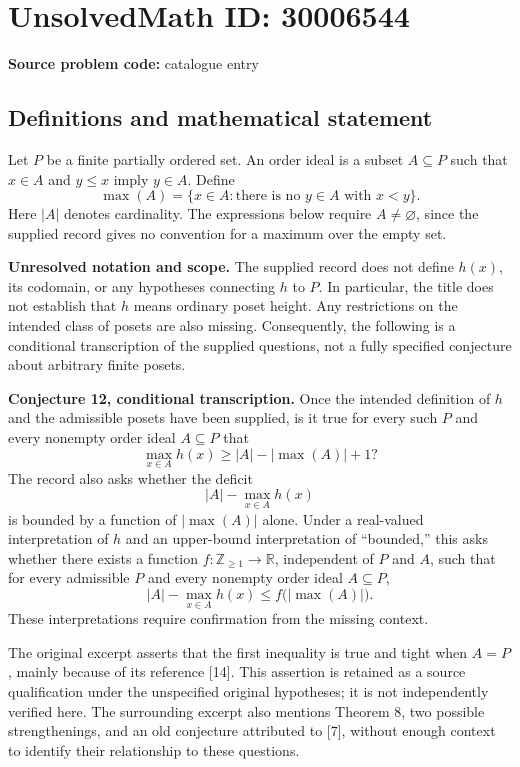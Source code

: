 \documentclass[11pt]{article}
\begin{document}
\section*{UnsolvedMath ID: 30006544}
\textbf{Source problem code:} catalogue entry
\subsection{Definitions and mathematical statement}
Let \(P\) be a finite partially ordered set. An order ideal is a subset \(A\subseteq P\) such that \(x\in A\) and \(y\leq x\) imply \(y\in A\). Define
\[
\max(A)=\{x\in A:\text{there is no }y\in A\text{ with }x<y\}.
\]
Here \(|A|\) denotes cardinality. The expressions below require \(A\neq\varnothing\), since the supplied record gives no convention for a maximum over the empty set.

\textbf{Unresolved notation and scope.} The supplied record does not define \(h(x)\), its codomain, or any hypotheses connecting \(h\) to \(P\). In particular, the title does not establish that \(h\) means ordinary poset height. Any restrictions on the intended class of posets are also missing. Consequently, the following is a conditional transcription of the supplied questions, not a fully specified conjecture about arbitrary finite posets.

\textbf{Conjecture 12, conditional transcription.} Once the intended definition of \(h\) and the admissible posets have been supplied, is it true for every such \(P\) and every nonempty order ideal \(A\subseteq P\) that
\[
\max_{x\in A}h(x)\geq |A|-|\max(A)|+1?
\]
The record also asks whether the deficit
\[
|A|-\max_{x\in A}h(x)
\]
is bounded by a function of \(|\max(A)|\) alone. Under a real-valued interpretation of \(h\) and an upper-bound interpretation of ``bounded,'' this asks whether there exists a function \(f:\mathbb Z_{\geq1}\to\mathbb R\), independent of \(P\) and \(A\), such that for every admissible \(P\) and every nonempty order ideal \(A\subseteq P\),
\[
|A|-\max_{x\in A}h(x)\leq f\bigl(|\max(A)|\bigr).
\]
These interpretations require confirmation from the missing context.

The original excerpt asserts that the first inequality is true and tight when \(A=P\), mainly because of its reference [14]. This assertion is retained as a source qualification under the unspecified original hypotheses; it is not independently verified here. The surrounding excerpt also mentions Theorem 8, two possible strengthenings, and an old conjecture attributed to [7], without enough context to identify their relationship to these questions.
\end{document}

